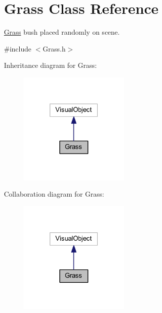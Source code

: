 \hypertarget{class_grass}{}\section{Grass Class Reference}
\label{class_grass}


\mbox{\hyperlink{class_grass}{Grass}} bush placed randomly on scene.  




{\ttfamily \#include $<$Grass.\+h$>$}



Inheritance diagram for Grass\+:
\nopagebreak
\begin{figure}[H]
\begin{center}
\leavevmode
\includegraphics[width=152pt]{class_grass__inherit__graph}
\end{center}
\end{figure}


Collaboration diagram for Grass\+:
\nopagebreak
\begin{figure}[H]
\begin{center}
\leavevmode
\includegraphics[width=152pt]{class_grass__coll__graph}
\end{center}
\end{figure}
